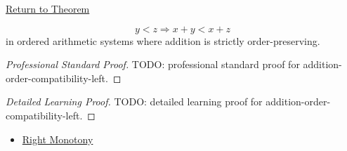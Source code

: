 \newpage
{}
\label{prf:addition-order-compatibility-left}

\begin{remark*}[Return]
\hyperref[prop:addition-order-compatibility-left]{Return to Theorem}
\end{remark*}

\begin{proposition*}
\[
y<z \Longrightarrow x+y<x+z
\]
in ordered arithmetic systems where addition is strictly order-preserving.
\end{proposition*}

\begin{proof}[Professional Standard Proof]
\LRAProofBodyStart
TODO: professional standard proof for addition-order-compatibility-left.
\end{proof}

\begin{proof}[Detailed Learning Proof]
\LRAProofBodyStart
TODO: detailed learning proof for addition-order-compatibility-left.
\end{proof}

\begin{remark*}
\end{remark*}

\begin{dependencies}
\begin{itemize}
  \item \hyperref[def:right-monotony]{Right Monotony}
\end{itemize}
\end{dependencies}

\clearpage
